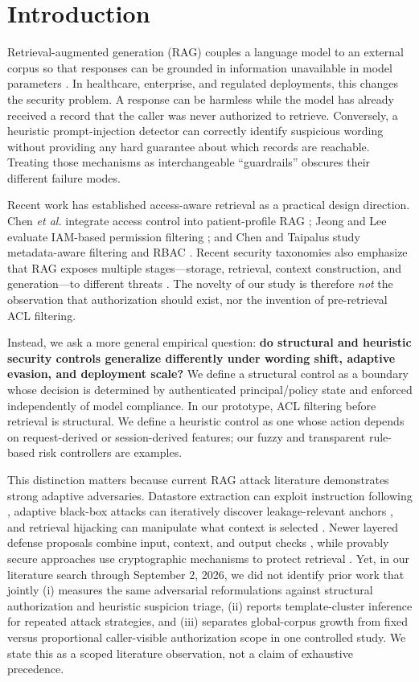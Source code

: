 \section{Introduction}
Retrieval-augmented generation (RAG) couples a language model to an external corpus so that responses can be grounded in information unavailable in model parameters \cite{lewis2020rag}. In healthcare, enterprise, and regulated deployments, this changes the security problem. A response can be harmless while the model has already received a record that the caller was never authorized to retrieve. Conversely, a heuristic prompt-injection detector can correctly identify suspicious wording without providing any hard guarantee about which records are reachable. Treating those mechanisms as interchangeable ``guardrails'' obscures their different failure modes.

Recent work has established access-aware retrieval as a practical design direction. Chen \emph{et al.} integrate access control into patient-profile RAG \cite{chen2025sac}; Jeong and Lee evaluate IAM-based permission filtering \cite{jeong2025permission}; and Chen and Taipalus study metadata-aware filtering and RBAC \cite{chen2026metadata}. Recent security taxonomies also emphasize that RAG exposes multiple stages---storage, retrieval, context construction, and generation---to different threats \cite{xu2026taxonomy,palanisamy2026survey}. The novelty of our study is therefore \emph{not} the observation that authorization should exist, nor the invention of pre-retrieval ACL filtering.

Instead, we ask a more general empirical question: \textbf{do structural and heuristic security controls generalize differently under wording shift, adaptive evasion, and deployment scale?} We define a structural control as a boundary whose decision is determined by authenticated principal/policy state and enforced independently of model compliance. In our prototype, ACL filtering before retrieval is structural. We define a heuristic control as one whose action depends on request-derived or session-derived features; our fuzzy and transparent rule-based risk controllers are examples.

This distinction matters because current RAG attack literature demonstrates strong adaptive adversaries. Datastore extraction can exploit instruction following \cite{qi2025spill}, adaptive black-box attacks can iteratively discover leakage-relevant anchors \cite{dimaio2025pirates}, and retrieval hijacking can manipulate what context is selected \cite{zhang2024hijack}. Newer layered defense proposals combine input, context, and output checks \cite{saleem2026layered}, while provably secure approaches use cryptographic mechanisms to protect retrieval \cite{zhou2025provable}. Yet, in our literature search through September 2, 2026, we did not identify prior work that jointly (i) measures the same adversarial reformulations against structural authorization and heuristic suspicion triage, (ii) reports template-cluster inference for repeated attack strategies, and (iii) separates global-corpus growth from fixed versus proportional caller-visible authorization scope in one controlled study. We state this as a scoped literature observation, not a claim of exhaustive precedence.

